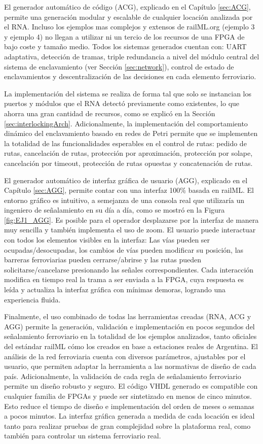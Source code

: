 El generador automático de código (ACG), explicado en el Capítulo \ref{sec:ACG}, permite una generación modular y escalable de cualquier locación analizada por el RNA. Incluso los ejemplos mas complejos y extensos de railML.org (ejemplo 3 y ejemplo 4) no llegan a utilizar ni un tercio de los recursos de una FPGA de bajo coste y tamaño medio. Todos los sistemas generados cuentan con: UART adaptativa, detección de tramas, triple redundancia a nivel del módulo central del sistema de enclavamiento (ver Sección \ref{sec:network}), control de estado de enclavamientos y descentralización de las decisiones en cada elemento ferroviario.

La implementación del sistema se realiza de forma tal que solo se instancian los puertos y módulos que el RNA detectó previamente como existentes, lo que ahorra una gran cantidad de recursos, como se explicó en la Sección \ref{sec:interlockingArch}. Adicionalmente, la implementación del comportamiento dinámico del enclavamiento basado en redes de Petri permite que se implementen la totalidad de las funcionalidades esperables en el control de rutas: pedido de rutas, cancelación de rutas, protección por aproximación, protección por solape, cancelación por timeout, protección de rutas opuestas y concatenación de rutas.

El generador automático de interfaz gráfica de usuario (AGG), explicado en el Capítulo \ref{sec:AGG}, permite contar con una interfaz 100\% basada en railML. El entorno gráfico es intuitivo, a semejanza de una consola real que utilizaría un ingeniero de señalamiento en su día a día, como se mostró en la Figura \ref{fig:EJ1_AGG}. Es posible para el operador desplazarse por la interfaz de manera muy sencilla y también implementa el uso de zoom. El usuario puede interactuar con todos los elementos visibles en la interfaz: Las vías pueden ser ocupadas/desocupadas, los cambios de vías pueden modificar su posición, las barreras ferroviarias pueden cerrarse/abrirse y las rutas pueden solicitarse/cancelarse presionando las señales correspondientes. Cada interacción modifica en tiempo real la trama a ser enviada a la FPGA, cuya respuesta es leída y actualiza la interfaz gráfica con mínimas demoras, logrando una experiencia fluida.

Finalmente, el uso combinado de todas las herramientas creadas (RNA, ACG y AGG) permite la generación, validación e implementación en pocos segundos del señalamiento ferroviario en la totalidad de los ejemplos analizados, tanto oficiales del estándar railML cómo los creados en base a estaciones reales de Argentina. El análisis de la red ferroviaria cuenta con diversos parámetros, ajustables por el usuario, que permiten adaptar la herramienta a las normativas de diseño de cada país. Adicionalmente, la validación de cada regla de señalamiento ferroviario permite un diseño robusto y seguro. El código VHDL generado es compatible con cualquier familia de FPGAs y puede ser sintetizado en menos de cinco minutos. Esto reduce el tiempo de diseño e implementación del orden de meses o semanas a pocos minutos. La interfaz gráfica generada a medida de cada locación es ideal tanto para realizar pruebas de gran complejidad sobre la plataforma real, como también para controlar un sistema ferroviario real.

